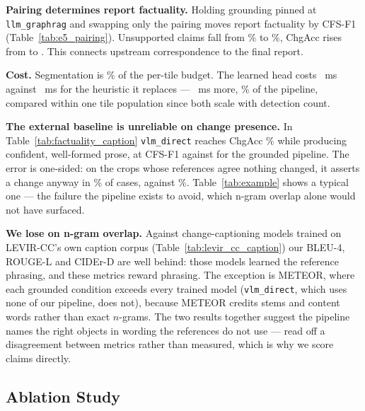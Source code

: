 \textbf{Pairing determines report factuality.} Holding grounding pinned at
\texttt{llm\_graphrag} and swapping only the pairing moves report factuality by
\EFiveGain{} CFS-F1 (Table~\ref{tab:e5_pairing}). Unsupported claims fall from
\EFiveHeuristicHal\% to \EFiveLearnedHal\%, ChgAcc rises from
\EFiveHeuristicChgAcc{} to \EFiveLearnedChgAcc. This connects upstream
correspondence to the final report.



\textbf{Cost.} Segmentation is \ESixDetectShare\% of the per-tile budget. The
learned head costs \ESixHeadMs~ms against \ESixHeuristicMs~ms for the heuristic
it replaces --- \ESixHeadDelta~ms more, \ESixPipelineShare\% of the pipeline,
compared within one tile population since both scale with detection count.




\textbf{The external baseline is unreliable on change presence.}
In Table~\ref{tab:factuality_caption} \texttt{vlm\_direct} reaches ChgAcc
\EFourVLMChgAcc\% while producing confident, well-formed prose, at CFS-F1
\EFourVLMFOne{} against \EFourGraphRAGFOne{} for the grounded pipeline. The
error is one-sided: on the \EFourNNoChange{} crops whose references agree
nothing changed, it asserts a change anyway in \EFourVLMFalseChange\% of cases,
against \EFourGraphRAGFalseChange\%. Table~\ref{tab:example} shows a typical
one --- the failure the pipeline exists to avoid, which n-gram overlap alone
would not have surfaced.

\textbf{We lose on n-gram overlap.} Against change-captioning models trained
on LEVIR-CC's own caption corpus (Table~\ref{tab:levir_cc_caption}) our BLEU-4,
ROUGE-L and CIDEr-D are well behind: those models learned the reference
phrasing, and these metrics reward phrasing. The exception is METEOR, where
each grounded condition exceeds every trained model (\texttt{vlm\_direct}, which
uses none of our pipeline, does not), because METEOR credits stems and content
words rather than exact $n$-grams. The two results together suggest the pipeline
names the right objects in wording the references do not use --- read off a
disagreement between metrics rather than measured, which is why we score claims
directly.



\subsection{Ablation Study}
\label{ssec:ablation}

